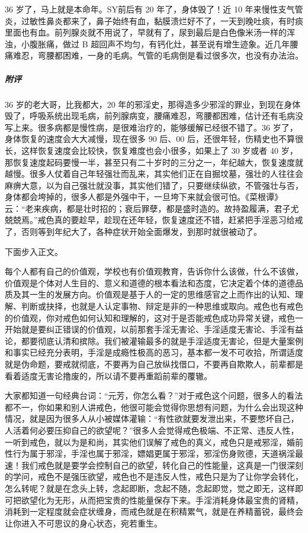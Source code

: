 \begin{case}
    36 岁了，马上就是本命年。SY前后有 20 年了，身体毁了！近 10 年来慢性支气管炎，过敏性鼻炎都来了，鼻子始终有血，黏膜溃烂好不了，一天到晚吐痰，有时痰里面也有血。前列腺炎就不用说了，早就有了，尿到最后是白色像米汤一样的浑浊，小腹胀痛，做过 B 超回声不均匀，有钙化灶，甚至说有增生迹象。近几年腰痛难忍，弯腰都困难，一身的毛病。气管的毛病倒是看过很多次，也没有办法治。
    \subparagraph{附评} 36 岁的老大哥，比我都大，20 年的邪淫史，那得造多少邪淫的罪业，到现在身体毁了，呼吸系统出现毛病，前列腺病变，腰痛难忍，弯腰都困难，估计还有毛病没写上来。很多病都是慢性病，是很难治疗的，能够缓解已经很不错了。36 岁了，身体恢复的速度会大大减慢，现在很多 90 后、00 后，还很年轻，伤精史也不算很长，这样恢复速度会比较快，恢复难度也会小很多，如果上了 30 岁或者 40 岁，那恢复速度起码要慢一半，甚至只有二十岁时的三分之一，年纪越大，恢复速度就越慢。很多人仗着自己年轻强壮而乱来，其实他们正在自掘坟墓，强壮的人往往会麻痹大意，以为自己强壮就没事，其实他们错了，只要继续纵欲，不管强壮与否，身体都会垮掉的，很多人都是外强中干，一旦垮下来就会很可怕。《菜根谭》云：“老来疾病，都是壮时招的；衰后罪孽，都是盛时造的。故持盈履满，君子尤兢兢焉。”戒色真的要趁早，趁现在还年轻，恢复速度还不错，赶紧把手淫恶习给戒了，否则等到年纪大了，各种症状开始全面爆发，到那时就很被动了。
\end{case}

下面步入正文。

每个人都有自己的价值观，学校也有价值观教育，告诉你什么该做，什么不该做，价值观是个体对人生目的、意义和道德的根本看法和态度，它决定着个体的道德品质及其一生的发展方向。价值观是基于人的一定的思维感官之上而作出的认知、理解、判断或抉择，也就是人认定事物、辩定是非的一种思维或取向。戒色也有戒色的价值观，你对戒色如何认知和理解的，这对于是否能戒色成功异常关键，戒色一开始就是要纠正错误的价值观，以前那套手淫无害论、手淫适度无害论、手淫有益论，都要彻底认清和摈除。我们被灌输最多的就是手淫适度无害论，但是大量案例和事实已经充分表明，手淫是成瘾性极高的恶习，基本都一发不可收拾，所谓适度就是伪命题，要戒就彻底，不要再为自己放纵找借口，不要再自欺欺人，前辈都是看着适度无害论撸废的，所以请不要再重蹈前辈的覆辙。

大家都知道一句经典台词：“元芳，你怎么看？”对于戒色这个问题，很多人的看法都不一，你如果和别人讲戒色，他很可能会觉得你思想有问题，为什么会出现这种情况，就是因为很多人从小被媒体灌输：“有性欲就要发泄出来，不要憋坏自己，人活着何必要压抑自己的欲望呢？”很多人会觉得戒色极端、不正常、违反人性，一听到戒色，就以为是和尚，其实他们误解了戒色的真义，戒色只是戒邪淫，婚前性行为属于邪淫，手淫也属于邪淫，嫖娼更属于邪淫，邪淫伤身败德，天道祸淫最速！我们戒色就是要学会控制自己的欲望，转化自己的性能量，这真是一门很深刻的学问，戒色不是强压欲望，戒色也不是违反人性，戒色只是为了让你学会转化，怎么转呢？就是在念头上转，念起即断，念起不随，念起即觉，觉之即无，这样即可把欲望化为无形，从而把宝贵的性能量保存下来。手淫消耗身体最宝贵的肾精，消耗到一定程度就会症状缠身，而戒色就是在积精累气，就是在养精蓄锐，最终会让你进入不可思议的身心状态，宛若重生。

